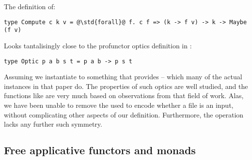 The  definition of:

\begin{verbatim}
type Compute c k v = @\std{forall}@ f. c f => (k -> f v) -> k -> Maybe (f v)
\end{verbatim}

Looks tantalisingly close to the profunctor optics definition in \cite{gibbons-profunctor-optics}:

\begin{verbatim}
type Optic p a b s t = p a b -> p s t
\end{verbatim}

Assuming we instantiate  to something that provides  -- which many of the actual instances in that paper do. The properties of such optics are well studied, and the functions like  are very much based on observations from that field of work. Alas, we have been unable to remove the  used to encode whether a file is an input, without complicating other aspects of our definition. Furthermore, the  operation lacks any further such symmetry.

\subsection{Free applicative functors and monads}\label{sec-related-free}

